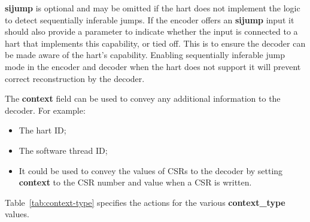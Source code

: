 \textbf{sijump} is optional and may be omitted if the hart does not implement the logic to detect
sequentially inferable jumps.  If the encoder offers an \textbf{sijump} input it should also provide a
parameter to indicate whether the input is connected to a hart that implements this capability, or
tied off.  This is to ensure the decoder can be made aware of the hart's capability.  Enabling 
sequentially inferable jump mode in the encoder and decoder when the hart does not support it will
prevent correct reconstruction by the decoder. 

The \textbf{context} field can be used to convey any additional information to the decoder.  For example:

\begin{itemize}
  \item The hart ID;
  \item The software thread ID;
  \item It could be used to convey the values of CSRs to the decoder by setting \textbf{context} to the 
    CSR number and value when a CSR is written.
\end{itemize}

Table~\ref{tab:context-type} specifies the actions for the various \textbf{context\_type} values.

